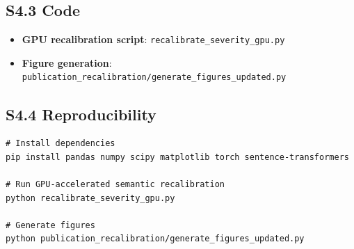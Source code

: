 \documentclass[11pt,a4paper]{article}
\begin{document}
\subsection{S4.3 Code}
\begin{itemize}
    \item \textbf{GPU recalibration script}: \texttt{recalibrate\_severity\_gpu.py}
    \item \textbf{Figure generation}: \texttt{publication\_recalibration/generate\_figures\_updated.py}
\end{itemize}

\subsection{S4.4 Reproducibility}
\begin{verbatim}
# Install dependencies
pip install pandas numpy scipy matplotlib torch sentence-transformers

# Run GPU-accelerated semantic recalibration
python recalibrate_severity_gpu.py

# Generate figures
python publication_recalibration/generate_figures_updated.py
\end{verbatim}
\end{document}
